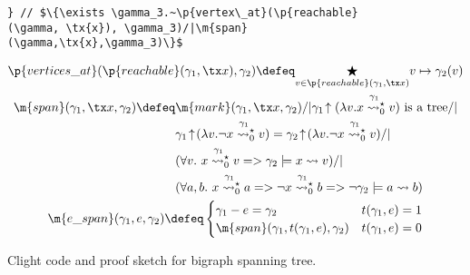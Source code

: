 \begin{figure}[htbp]
\begin{lstlisting}
} // $\{\exists \gamma_3.~\p{vertex\_at}(\p{reachable}(\gamma, \tx{x}), \gamma_3)/|\m{span}(\gamma,\tx{x},\gamma_3)\}$
  \end{lstlisting}
  \small
\begin{gather*}
  \p{vertices\_at}(\p{reachable}(\gamma_1, \tx x), \gamma_2)\defeq \underset{v\in\p{reachable}(\gamma_1, \tx x)}{\bigstar}v \mapsto \gamma_2(v)\\
  \begin{split}
  \m{span}(\gamma_1, \tx x, \gamma_2)\defeq &\m{mark}(\gamma_1,\tx x, \gamma_2) /| \gamma_1\!\uparrow(\lambda v. x\mathrel{{\stackrel{\gamma_1~}{\leadsto^{\star}_{0}}}} v) \text{ is a tree} /| \null\\
  & \gamma_1\!\uparrow\!(\lambda v.\neg x\mathrel{{\stackrel{\gamma_1~}{\leadsto^{\star}_{0}}}} v) = \gamma_2\!\uparrow\!(\lambda v.\neg x\mathrel{{\stackrel{\gamma_1~}{\leadsto^{\star}_{0}}}} v) /| \null\\
  & (\forall v.~x\mathrel{{\stackrel{\gamma_1~}{\leadsto^{\star}_{0}}}} v => \gamma_2\models x \leadsto v) /| \null\\
  & (\forall a,b.~x\mathrel{{\stackrel{\gamma_1~}{\leadsto^{\star}_{0}}}} a => \neg x\mathrel{{\stackrel{\gamma_1~}{\leadsto^{\star}_{0}}}} b => \neg \gamma_2\models a \leadsto b)\\
  \end{split}\\
  \m{e\_span}(\gamma_1, e, \gamma_2)\defeq
  \begin{cases}
    \gamma_1 - e = \gamma_2  & t(\gamma_1,e)=1\\
    \m{span}(\gamma_1, t(\gamma_1,e), \gamma_2) & t(\gamma_1,e)=0\\
  \end{cases}
\end{gather*}
\caption{Clight code and proof sketch for bigraph spanning tree.}
\label{fig:spanning}

\end{figure}
